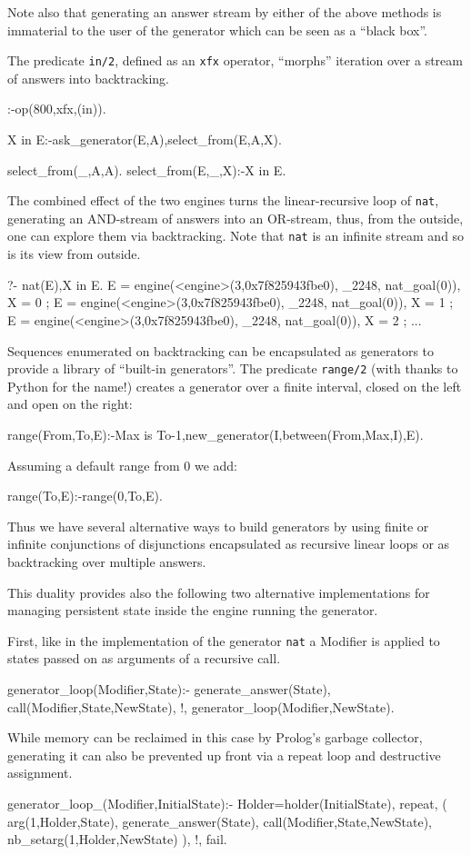\documentclass{new_tlp}
\begin{document}
Note also that generating an answer stream by either of the above methods
is immaterial to the user of the generator which can be seen as a ``black box''.

The predicate {\tt in/2}, defined as an {\tt xfx} operator,
``morphs'' iteration over  a stream of answers into backtracking.
\begin{code}
:-op(800,xfx,(in)).

X in E:-ask_generator(E,A),select_from(E,A,X).

select_from(_,A,A).
select_from(E,_,X):-X in E.
\end{code}

\BX
The combined effect of the two engines turns the linear-recursive loop of {\tt nat},
generating an AND-stream of answers into an OR-stream, thus, from the outside, one can explore them via backtracking. Note that {\tt nat} is an infinite stream and so is its
view from outside.
\begin{codex}
?- nat(E),X in E.
E = engine(<engine>(3,0x7f825943fbe0), _2248, nat_goal(0)),
X = 0 ;
E = engine(<engine>(3,0x7f825943fbe0), _2248, nat_goal(0)),
X = 1 ;
E = engine(<engine>(3,0x7f825943fbe0), _2248, nat_goal(0)),
X = 2 ;
...
\end{codex}
\EX

Sequences enumerated on backtracking can be encapsulated as generators to provide a library of ``built-in generators''.
The predicate {\tt range/2} (with thanks to Python for the name!) creates a generator over a finite interval, closed on the left and open on the right:
\begin{code}
range(From,To,E):-Max is To-1,new_generator(I,between(From,Max,I),E).
\end{code}
Assuming a  default range from 0 we add:
\begin{code}
range(To,E):-range(0,To,E).
\end{code}

Thus we have several alternative ways to build generators by using finite or infinite conjunctions of disjunctions encapsulated as recursive linear loops or as backtracking over multiple answers.

This duality provides also the following two alternative implementations
for managing persistent state inside the engine running the generator.

First, like in the implementation of the generator {\tt nat} a Modifier
is applied to states passed on as arguments of a recursive call. 
\begin{code}
generator_loop(Modifier,State):-
  generate_answer(State),
  call(Modifier,State,NewState),
  !,
  generator_loop(Modifier,NewState).
\end{code}
While memory can be reclaimed in this case by Prolog's garbage collector,
generating it can also be prevented up front via a repeat loop and destructive assignment.
\begin{code}
generator_loop_(Modifier,InitialState):-
  Holder=holder(InitialState),
  repeat,
    \+ (
      arg(1,Holder,State),
      generate_answer(State),
      call(Modifier,State,NewState),
      nb_setarg(1,Holder,NewState)
    ),
  !,
  fail.
\end{code}
\end{document}
